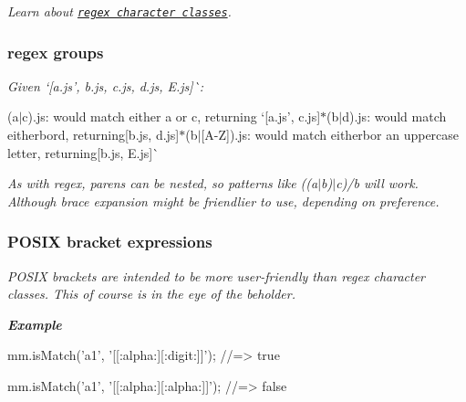 {\itshape Learn about \href{http://www.regular-expressions.info/charclass.html}{\tt regex character classes}.}

{\itshape \subsubsection*{regex groups}}

{\itshape }

{\itshape Given `\mbox{[}\textquotesingle{}a.\+js', \textquotesingle{}b.\+js\textquotesingle{}, \textquotesingle{}c.\+js\textquotesingle{}, \textquotesingle{}d.\+js\textquotesingle{}, \textquotesingle{}E.\+js\textquotesingle{}\mbox{]}\`{}\+:}

{\itshape 
\begin{DoxyItemize}
\item {\ttfamily (a$\vert$c).js}\+: would match either {\ttfamily a} or {\ttfamily c}, returning `\mbox{[}\textquotesingle{}a.\+js', \textquotesingle{}c.\+js\textquotesingle{}\mbox{]}{\ttfamily  $\ast$}(b$\vert$d).js{\ttfamily \+: would match either}b{\ttfamily or}d{\ttfamily , returning}\mbox{[}\textquotesingle{}b.\+js\textquotesingle{}, \textquotesingle{}d.\+js\textquotesingle{}\mbox{]}{\ttfamily  $\ast$}(b$\vert$\mbox{[}A-\/Z\mbox{]}).js{\ttfamily \+: would match either}b{\ttfamily or an uppercase letter, returning}\mbox{[}\textquotesingle{}b.\+js\textquotesingle{}, \textquotesingle{}E.\+js\textquotesingle{}\mbox{]}\`{}
\end{DoxyItemize}}

{\itshape As with regex, parens can be nested, so patterns like {\ttfamily ((a$\vert$b)$\vert$c)/b} will work. Although brace expansion might be friendlier to use, depending on preference.}

{\itshape \subsubsection*{P\+O\+S\+IX bracket expressions}}

{\itshape }

{\itshape P\+O\+S\+IX brackets are intended to be more user-\/friendly than regex character classes. This of course is in the eye of the beholder.}

{\itshape {\bfseries Example}}

{\itshape 
\begin{DoxyCode}
mm.isMatch('a1', '[[:alpha:][:digit:]]');
//=> true

mm.isMatch('a1', '[[:alpha:][:alpha:]]');
//=> false
\end{DoxyCode}
}


